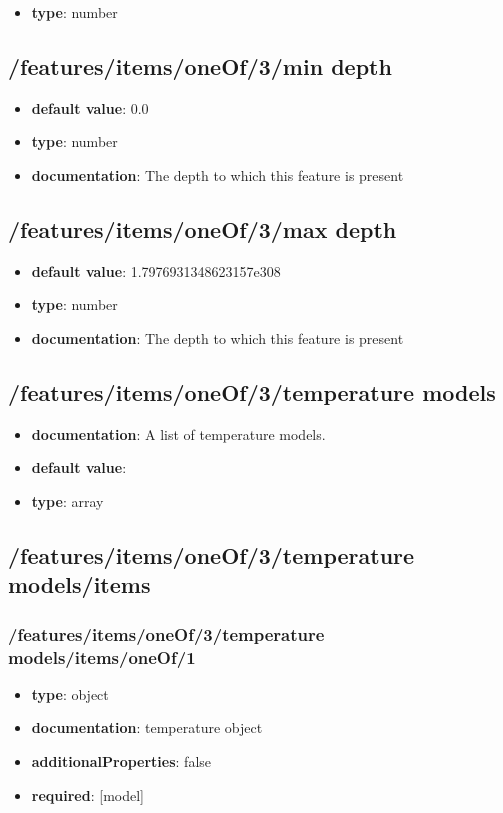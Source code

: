\begin{itemize}\item {\bf type}: number
\end{itemize}\subsection{/features/items/oneOf/3/min depth}
\begin{itemize}\item {\bf default value}: 0.0
\item {\bf type}: number
\item {\bf documentation}: The depth to which this feature is present
\end{itemize}\subsection{/features/items/oneOf/3/max depth}
\begin{itemize}\item {\bf default value}: 1.7976931348623157e308
\item {\bf type}: number
\item {\bf documentation}: The depth to which this feature is present
\end{itemize}\subsection{/features/items/oneOf/3/temperature models}
\begin{itemize}\item {\bf documentation}: A list of temperature models.
\item {\bf default value}: 
\item {\bf type}: array
\end{itemize}\subsection{/features/items/oneOf/3/temperature models/items}

\subsubsection{/features/items/oneOf/3/temperature models/items/oneOf/1}
\begin{itemize}\item {\bf type}: object
\item {\bf documentation}: temperature object
\item {\bf additionalProperties}: false
\item {\bf required}: [model]\end{itemize}
